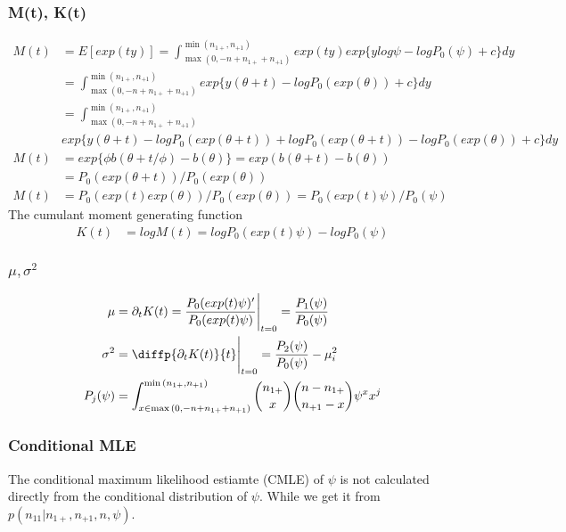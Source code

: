 \documentclass[11pt]{article} %
\begin{document}
\begin{itemize}
\subsubsection{M(t), K(t)}
\begin{align*}
	M(t) &= E[exp(ty)] = \int_{ \max{(0, -n + n_{1+} + n_{+1})}}^{\min{(n_{1+}, n_{+1})}} exp(ty)exp\{ y log \psi - log P_0(\psi) + c \} dy\\
	&= \int_{ \max{(0, -n + n_{1+} + n_{+1})}}^{\min{(n_{1+}, n_{+1})}} exp\{ y (\theta + t) - log P_0(exp(\theta)) + c \} dy\\
	&=\int_{ \max{(0, -n + n_{1+} + n_{+1})}}^{\min{(n_{1+}, n_{+1})}}\\
	& exp\{ y (\theta + t) - log P_0(exp(\theta + t)) + log P_0(exp(\theta + t)) - log P_0(exp(\theta))+ c \} dy \\
	M(t) &=exp\{\phi b(\theta + t/\phi) - b(\theta)\}= exp(b(\theta + t) - b(\theta))\\
	&= P_0(exp(\theta + t))/ P_0(exp(\theta))\\
	M(t) &= P_0(exp(t)exp(\theta)) /P_0(exp(\theta)) =  P_0(exp(t)\psi) /P_0(\psi)
\end{align*}
The cumulant moment generating function
\begin{align*}
	K(t) &= log M(t) = log P_0(exp(t)\psi) - log P_0(\psi)
\end{align*}

\subsubsection{$\mu, \sigma^2$}

\begin{align*}
	\mu &= \partial_t K(t) = \frac{P_0(exp(t)\psi)'}{P_0(exp(t)\psi)} \Bigg{|}_{t=0} = \frac{P_1(\psi)}{P_0(\psi)}\\
	\sigma^2 &= \diffp{{\partial_t K(t)}}{t} \Bigg{|}_{t=0}
	 = \frac{P_2(\psi)}{P_0(\psi)} - \mu_i^2 \\
	P_{j}(\psi) &= \int_{x \in \max{(0, -n + n_{1+} + n_{+1})}}^{\min{(n_{1+}, n_{+1})}} {n_{1+} \choose x}{n-n_{1+} \choose n_{+1}-x} \psi^x x^j
\end{align*}

\subsubsection{Conditional MLE}
The conditional maximum likelihood estiamte (CMLE) of $\psi$ is not calculated directly from the conditional distribution of $\psi$. While we get it from $p(n_{11}| n_{1+}, n_{+1}, n, \psi)$.


\end{itemize}
\end{document}
